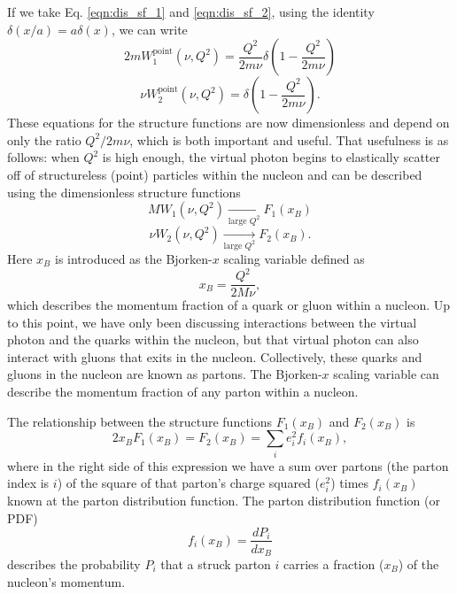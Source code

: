 If we take Eq. \ref{eqn:dis_sf_1} and \ref{eqn:dis_sf_2}, using the identity $\delta(x/a) = a\delta(x)$, we can write
\begin{equation}
\nonumber
2mW_1^{\mathrm{point}}(\nu,Q^2) = \frac{Q^2}{2m\nu} \delta \left( 1- \frac{Q^2}{2m\nu} \right)
\end{equation}
\begin{equation}
\nu W_2^{\mathrm{point}}(\nu,Q^2) = \delta \left( 1- \frac{Q^2}{2m\nu} \right).
\end{equation}
These equations for the structure functions are now dimensionless and depend on only the ratio $Q^2/2m\nu$, which is both important and useful. That usefulness is as follows: when $Q^2$ is high enough, the virtual photon begins to elastically scatter off of structureless (point) particles  within the nucleon and can be described using the dimensionless structure functions
\begin{equation}
\nonumber
MW_1(\nu,Q^2) \xrightarrow[\text{large $Q^2$}]{} F_1(x_B)
\end{equation}
\begin{equation}
\nu W_2(\nu,Q^2) \xrightarrow[\text{large $Q^2$}]{} F_2(x_B).
\end{equation}
Here $x_B$ is introduced as the Bjorken-$x$ scaling variable defined as
\begin{equation}
x_B = \frac{Q^2}{2M\nu},
\end{equation}
which describes the momentum fraction of a quark or gluon within a nucleon. Up to this point, we have only been discussing interactions between the virtual photon and the quarks within the nucleon, but that virtual photon can also interact with gluons that exits in the nucleon. Collectively, these quarks and gluons in the nucleon are known as partons. The Bjorken-$x$ scaling variable can describe the momentum fraction of any parton within a nucleon.

The relationship between the structure functions $F_1(x_B)$ and $F_2(x_B)$ is
\begin{equation}
2x_B F_1(x_B) = F_2(x_B) = \sum_i e_i^2 f_i (x_B), 
\end{equation} 
where in the right side of this expression we have a sum over partons (the parton index is $i$) of the square of that parton's charge squared ($e_i^2$) times $f_i(x_B)$ known at the parton distribution function. The parton distribution function (or PDF) 
\begin{equation}
f_i(x_B) = \frac{dP_i}{dx_B}
\end{equation}
describes the probability $P_i$ that a struck parton $i$ carries a fraction ($x_B$) of the nucleon's momentum.

